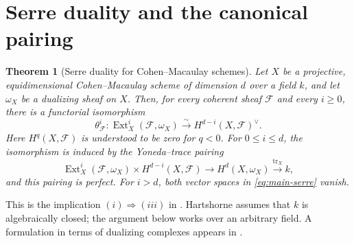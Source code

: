 \documentclass[11pt,a4paper]{article}
\newtheorem{theorem}{Theorem}[section]
\theoremstyle{definition}
\theoremstyle{remark}
\newcommand{\FF}{\mathcal F}
\newcommand{\Ext}{\operatorname{Ext}}
\newcommand{\tr}{\operatorname{tr}}
\newcommand{\dual}{^{\vee}}
\begin{document}
\section{Serre duality and the canonical pairing}
\label{sec:serre-duality-pairing}

\begin{theorem}[Serre duality for Cohen--Macaulay schemes]
\label{thm:main-serre}
Let $X$ be a projective, equidimensional Cohen--Macaulay scheme of dimension
$d$ over a field $k$, and let $\omega_X$ be a dualizing sheaf on $X$. Then,
for every coherent sheaf $\FF$ and every $i\geq0$, there is a functorial
isomorphism
\begin{equation}\label{eq:main-serre}
  \theta^i_{\FF}:\Ext_X^i(\FF,\omega_X)
  \xrightarrow{\ \sim\ }H^{d-i}(X,\FF)\dual.
\end{equation}
Here $H^q(X,\FF)$ is understood to be zero for $q<0$. For
$0\leq i\leq d$, the isomorphism is induced by the Yoneda--trace pairing
\begin{equation}\label{eq:main-pairing}
  \Ext_X^i(\FF,\omega_X)\times H^{d-i}(X,\FF)
  \longrightarrow H^d(X,\omega_X)\xrightarrow{\tr_X}k,
\end{equation}
and this pairing is perfect. For $i>d$, both vector spaces in
\eqref{eq:main-serre} vanish.
\end{theorem}

This is the implication $(i)\Rightarrow(iii)$ in
\cite[Chapter III, Theorem 7.6(b)]{HartshorneAG}. Hartshorne assumes that
$k$ is algebraically closed; the argument below works over an arbitrary
field. A formulation in terms of dualizing complexes appears in
\cite[Tag 0FVZ]{Stacks}.
\end{document}
